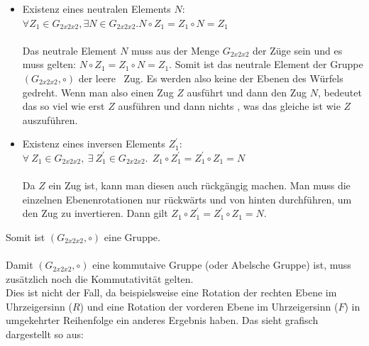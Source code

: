 \documentclass[12pt,a4paper, usenames, dvipsnames]{article}
\begin{document}
\begin{itemize}
\item Existenz eines neutralen Elements $N$:  \\
$\forall Z_1 \in G_{2x2x2}, \exists N \in G_{2x2x2}.N \circ Z_1 = Z_1 \circ N = Z_1$ \\
\\
Das neutrale Element $N$ muss aus der Menge $G_{2x2x2}$ der Züge sein und es muss gelten: $N \circ Z_1 = Z_1 \circ N = Z_1$. Somit ist das neutrale Element der Gruppe $(G_{2x2x2}, \circ)$ der \glqq leere \grqq \ Zug. Es werden also keine der Ebenen des Würfels gedreht. Wenn man also einen Zug $Z$ ausführt und dann den Zug $N$, bedeutet das so viel wie \glqq erst $Z$ ausführen und dann nichts \grqq , was das gleiche ist wie $Z$ auszuführen.


\item Existenz eines inversen Elements $Z_1^\prime$: \\ 
$\forall \  Z_1 \in G_{2x2x2},\ \exists \  Z_1^\prime \in G_{2x2x2}.  \ \ Z_1 \circ Z_1^\prime = Z_1^\prime \circ Z_1 = N$  \\
\\
Da $Z$ ein Zug ist, kann man diesen auch rückgängig machen. Man muss die einzelnen Ebenenrotationen nur rückwärts und von hinten durchführen, um den Zug zu invertieren. Dann gilt $Z_1 \circ Z_1^\prime = Z_1^\prime \circ Z_1 = N$.
\end{itemize}
Somit ist $(G_{2x2x2}, \circ)$ eine Gruppe. \\ 
\\
Damit $(G_{2x2x2}, \circ)$ eine kommutaive Gruppe (oder Abelsche Gruppe) ist, muss zusätzlich noch die Kommutativität gelten. \\
Dies ist nicht der Fall, da beispielsweise eine Rotation der rechten Ebene im Uhrzeigersinn ($R$) und eine Rotation der vorderen Ebene im Uhrzeigersinn ($F$) in umgekehrter Reihenfolge ein anderes Ergebnis haben. Das sieht grafisch dargestellt so aus: \\
\end{document}
